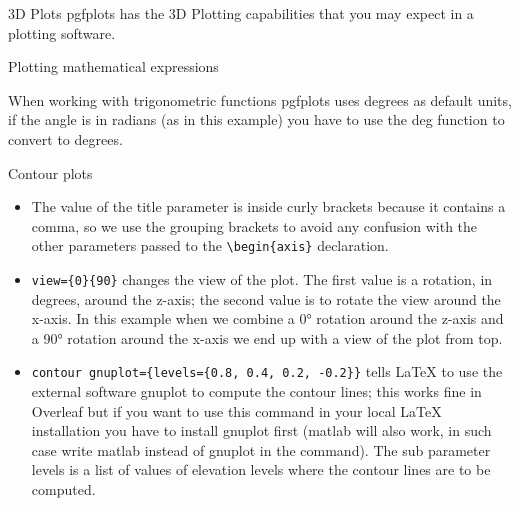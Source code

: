 \documentclass{beamer}
\begin{document}
\begin{frame}{3D Plots}
    pgfplots has the 3D Plotting capabilities that you may expect in a plotting software.
\end{frame}

\begin{frame}{Plotting mathematical expressions}
    When working with trigonometric functions pgfplots uses degrees as default units, if the angle is in radians (as in this example) you have to use the deg function to convert to degrees.
\end{frame}

\begin{frame}{Contour plots}
    \begin{itemize}
        \item The value of the title parameter is inside curly brackets because it contains a comma, so we use the grouping brackets to avoid any confusion with the other parameters passed to the \texttt{\textbackslash begin\{axis\}} declaration.
        \item \texttt{view=\{0\}\{90\}} changes the view of the plot. The first value is a rotation, in degrees, around the z-axis; the second value is to rotate the view around the x-axis. In this example when we combine a 0° rotation around the z-axis and a 90° rotation around the x-axis we end up with a view of the plot from top.
        \item \texttt{contour gnuplot=\{levels=\{0.8, 0.4, 0.2, -0.2\}\}} tells LaTeX to use the external software gnuplot to compute the contour lines; this works fine in Overleaf but if you want to use this command in your local LaTeX installation you have to install gnuplot first (matlab will also work, in such case write matlab instead of gnuplot in the command). The sub parameter levels is a list of values of elevation levels where the contour lines are to be computed.
    \end{itemize}
\end{frame}
		
\end{document}
